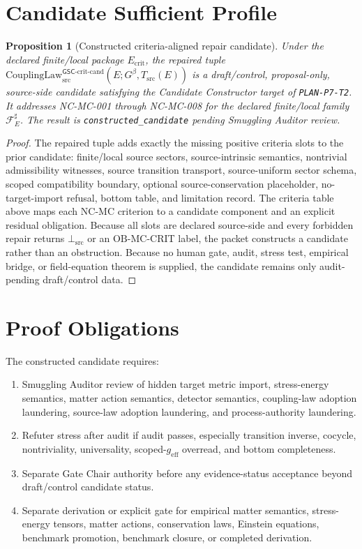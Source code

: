 \documentclass[11pt]{article}
\newcommand{\Gbeta}{G^\beta}
\newcommand{\geff}{g_{\mathrm{eff}}}
\newcommand{\CouplingLawCrit}{\mathrm{CouplingLaw}^{\mathsf{GSC}\mbox{-}\mathrm{crit}\mbox{-}\mathrm{cand}}_{\mathrm{src}}}
\newcommand{\BottomSrc}{\bot_{\mathrm{src}}}
\newcommand{\OBMC}{\mathrm{OB}\mbox{-}\mathrm{MC}}
\newcommand{\Fsrc}{\mathcal{F}_{E}^{\sharp}}
\newtheorem{proposition}{Proposition}
\begin{document}
\section{Candidate Sufficient Profile}

\begin{proposition}[Constructed criteria-aligned repair candidate]
Under the declared finite/local package \(E_{\mathrm{crit}}\), the repaired
tuple \(\CouplingLawCrit(E;\Gbeta,T_{\mathrm{src}}(E))\) is a
draft/control, proposal-only, source-side candidate satisfying the
Candidate Constructor target of \texttt{PLAN-P7-T2}. It addresses NC-MC-001
through NC-MC-008 for the declared finite/local family \(\Fsrc\). The result
is \texttt{constructed\_candidate} pending Smuggling Auditor review.
\end{proposition}

\begin{proof}
The repaired tuple adds exactly the missing positive criteria slots to the
prior candidate: finite/local source sectors, source-intrinsic semantics,
nontrivial admissibility witnesses, source transition transport,
source-uniform sector schema, scoped compatibility boundary, optional
source-conservation placeholder, no-target-import refusal, bottom table, and
limitation record. The criteria table above maps each NC-MC criterion to a
candidate component and an explicit residual obligation. Because all slots are
declared source-side and every forbidden repair returns \(\BottomSrc\) or an
\(\OBMC\)-CRIT label, the packet constructs a candidate rather than an
obstruction. Because no human gate, audit, stress test, empirical bridge, or
field-equation theorem is supplied, the candidate remains only audit-pending
draft/control data.
\end{proof}

\section{Proof Obligations}

The constructed candidate requires:
\begin{enumerate}[leftmargin=*]
  \item Smuggling Auditor review of hidden target metric import,
  stress-energy semantics, matter action semantics, detector semantics,
  coupling-law adoption laundering, source-law adoption laundering, and
  process-authority laundering.
  \item Refuter stress after audit if audit passes, especially transition
  inverse, cocycle, nontriviality, universality, scoped-\(\geff\) overread,
  and bottom completeness.
  \item Separate Gate Chair authority before any evidence-status acceptance
  beyond draft/control candidate status.
  \item Separate derivation or explicit gate for empirical matter semantics,
  stress-energy tensors, matter actions, conservation laws, Einstein
  equations, benchmark promotion, benchmark closure, or completed derivation.
\end{enumerate}
\end{document}
